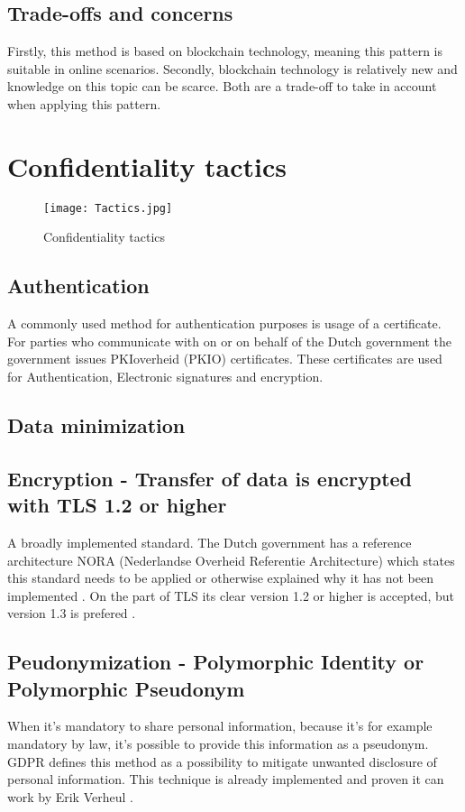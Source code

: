 \subsection{Trade-offs and concerns}
Firstly, this method is based on blockchain technology, meaning this pattern is suitable in online scenarios. Secondly, blockchain technology is relatively new and knowledge on this topic can be scarce. Both are a trade-off to take in account when applying this pattern. 

\section{Confidentiality tactics}
\graphicspath{ {./images/} }
\begin{figure}[t]
\centering
\label{fig:Tactics}
\texttt{[image: Tactics.jpg]}\\
\caption{Confidentiality tactics}
\end{figure}

\subsection{Authentication}
A commonly used method for authentication purposes is usage of a certificate. For parties who communicate with on or on behalf of the Dutch government the government issues PKIoverheid (PKIO) certificates. These certificates are used for Authentication, Electronic signatures and encryption. \cite{Logius_PKIO}

\subsection{Data minimization}
\lipsum[1-1]

\subsection{Encryption - Transfer of data is encrypted with TLS 1.2 or higher}
A broadly implemented standard. The Dutch government has a reference architecture NORA (Nederlandse Overheid Referentie Architecture) \cite{NORA} which states this standard needs to be applied or otherwise explained why it has not been implemented \cite{NORA_PasToeOfLegUit}. On the part of TLS its clear version 1.2 or higher is accepted, but version 1.3 is prefered \cite{NORA_TLS}. 

\subsection{Peudonymization - Polymorphic Identity or Polymorphic Pseudonym}
When it's mandatory to share personal information, because it's for example mandatory by law, it's possible to provide this information as a pseudonym. GDPR \cite{GDPR} defines this method as a possibility to mitigate unwanted disclosure of personal information. 
This technique is already implemented and proven it can work by Erik Verheul \cite{VerheuleID}. 

